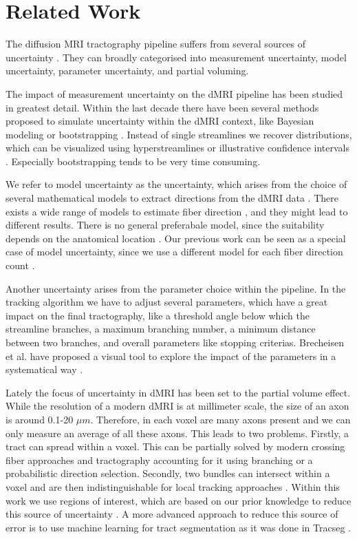 \section{Related Work}\label{sec:related}
The diffusion MRI tractography pipeline suffers from several sources of
uncertainty \cite{Schultz:SciVisBook2014, Schultz:NBM2018, Gillmann:STAR2021}.
They can broadly categorised into measurement uncertainty,
model uncertainty, parameter uncertainty, and partial voluming. 

The impact of measurement
uncertainty on the dMRI pipeline has been studied in greatest detail. Within the last
decade there have been several methods proposed to simulate uncertainty within
the dMRI context, like Bayesian modeling \cite{BEHRENS2007144} or bootstrapping
\cite{Chung:2006}. Instead of single streamlines we recover distributions,
which can be visualized using hyperstreamlines \cite{Jeurissen:2012, Wiens:2014}
or illustrative confidence intervals \cite{Brecheisen:2013}. Especially
bootstrapping tends to be very time consuming.

We refer to model uncertainty as the uncertainty, which arises from the choice
of several mathematical models to extract directions from the dMRI data
\cite{Schultz:SciVisBook2014}. There exists a wide range of models to estimate
fiber direction \cite{Panagiotaki:2012}, and they might lead to different
results. There is no general preferabale model, since the suitability depends  on
the anatomical location \cite{Bretthorst:2004,Freidlin:2007}. Our previous work
can be seen as a special case of model uncertainty, since we use a different model
for each fiber direction count \cite{Gruen:2021}. 

Another uncertainty arises from the parameter choice within the pipeline. In the
tracking algorithm we have to adjust several parameters, which have a great
impact on the final tractography, like a threshold angle below which the streamline
branches, a maximum branching number, a minimum distance between two branches,
and overall parameters like stopping criterias. Brecheisen et al. have proposed
a visual
tool to explore the impact of the parameters in a systematical way
\cite{Brecheisen:2009}.

Lately the focus of uncertainty in dMRI has been set to the partial volume
effect. While the resolution of a modern dMRI is at millimeter scale, the size of an axon is around 0.1-20 $\mu m$. Therefore, in each voxel
are many axons present and we can only measure an average of all these axons.
This leads to two problems. Firstly, a tract can spread within a voxel. This can
be partially solved by modern crossing fiber approaches and
tractography accounting for it using branching or a probabilistic direction
selection.
Secondly, two bundles can intersect
within a voxel and are then indistinguishable for local tracking approaches
\cite{Schilling:2022}. Within this work we use regions of interest, which are
based on our prior knowledge to reduce this source of uncertainty
\cite{MaierHein:2017}. A more
advanced approach to reduce this source of error is to use machine learning for
tract segmentation as it was done in Tracseg \cite{WASSERTHAL2018239}.


